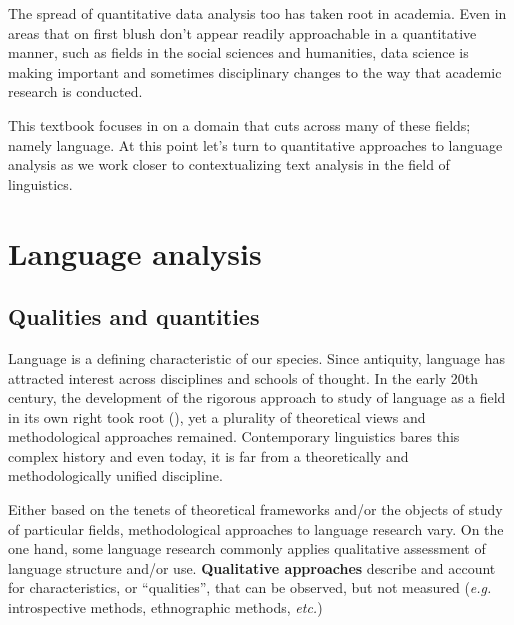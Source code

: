 \documentclass[
  letterpaper,
  krantz1]{latex/krantz-mod}
\theoremstyle{definition}
\theoremstyle{definition}
\theoremstyle{remark}
\begin{document}
The spread of quantitative data
analysis too has taken root in academia. Even in areas that on first
blush don't appear readily approachable in a quantitative manner, such
as fields in the social sciences and humanities, data science is making
important and sometimes disciplinary changes to the way that academic
research is conducted.

This textbook focuses in on a domain that cuts across many of these
fields; namely language. At this point let's turn to quantitative
approaches to language analysis as we work
closer to contextualizing text analysis in the field of
linguistics.

\section{Language analysis}\label{language-analysis}

\subsection{Qualities and quantities}\label{qualities-and-quantities}

Language is a defining characteristic of our species. Since antiquity,
language has attracted interest across disciplines and schools of
thought. In the early 20th century, the development of the rigorous
approach to study of language as a field in its own right took root
(), yet a plurality of
theoretical views and methodological approaches remained. Contemporary
linguistics bares this complex history and even today, it is far from a
theoretically and methodologically unified discipline.

Either based on the tenets of theoretical
frameworks and/or the objects of study of particular fields,
methodological approaches to language
research vary. On the one hand, some language research commonly applies
qualitative assessment of language structure and/or use.
\textbf{Qualitative approaches}  describe
and account for characteristics, or ``qualities'', that can be observed,
but not measured (\emph{e.g.} introspective
methods, ethnographic methods, \emph{etc.})

\pagebreak
\end{document}

